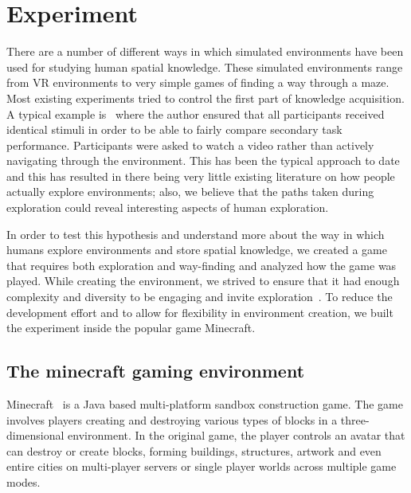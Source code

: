 
\section{Experiment} %
\label{sec:experiment_performed_minecraft}


There are a number of different ways in which simulated environments have been used for studying human spatial knowledge. These simulated environments range from VR environments to very simple games of finding a way through a maze. Most existing experiments tried to control the first part of knowledge acquisition. A typical example is~\cite{meilinger2008working} where the author ensured that all participants received identical stimuli in order to be able to fairly compare secondary task performance. Participants were asked to watch a video rather than actively navigating through the environment. This has been the typical approach to date and this has resulted in there being very little existing literature on how people actually explore environments; also, we believe that the paths taken during exploration could reveal interesting aspects of human exploration.

In order to test this hypothesis and understand more about the way in which humans explore environments and store spatial knowledge, we created a game that requires both exploration and way-finding and analyzed how the game was played. While creating the environment, we strived to ensure that it had enough complexity and diversity to be engaging and invite exploration~\cite{kaplan1983cognition,Montello:2004uj}. To reduce the development effort and to allow for flexibility in environment creation, we built the experiment inside the popular game Minecraft.

\subsection{The minecraft gaming environment}
\label{sec:the_minecraft_gaming_environment}

Minecraft~\cite{Minecraft} is a Java based multi-platform sandbox construction game. The game involves players creating and destroying various types of blocks in a three-dimensional environment. In the original game, the player controls an avatar that can destroy or create blocks, forming buildings, structures, artwork and even entire cities on multi-player servers or single player worlds across multiple game modes.



